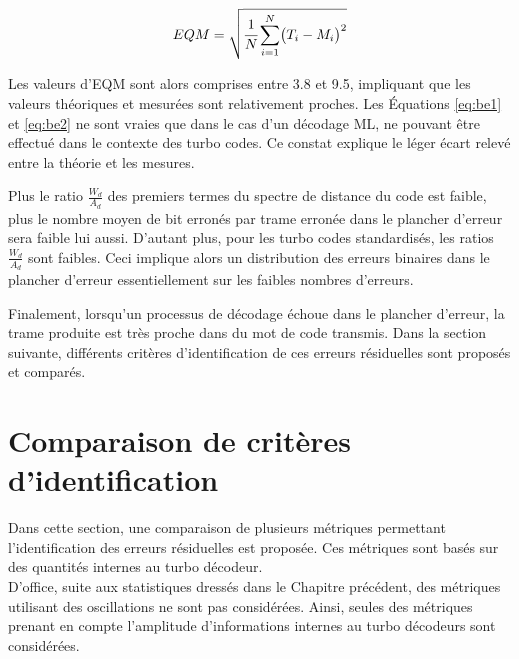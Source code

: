 \begin{equation}
	EQM = \sqrt{\cfrac{1}{N}\sum\limits_{i=1}^N\bigl(T_i-M_i\bigr)^2}
	\label{eq:eqm}
\end{equation}

Les valeurs d'EQM sont alors comprises entre 3.8 et 9.5, impliquant que les valeurs théoriques et mesurées sont 
relativement proches. Les Équations \ref{eq:be1} et \ref{eq:be2} ne sont vraies que dans le cas d'un décodage 
ML, ne pouvant être effectué dans le contexte des turbo codes. Ce constat explique le léger écart relevé entre la 
théorie et les mesures.

Plus le ratio $\frac{W_d}{A_d}$ des premiers termes du spectre de distance du code est faible, plus le nombre moyen de 
bit erronés par trame erronée dans le plancher d'erreur sera faible lui aussi. D'autant plus, pour les turbo codes 
standardisés, les ratios $\frac{W_d}{A_d}$ sont faibles. Ceci implique alors un distribution des erreurs binaires dans 
le plancher d'erreur essentiellement sur les faibles nombres d'erreurs.
\begin{table}[b]
\centering
\caption{Erreur quadratique moyenne entre théorie et simulations Monte-Carlo}
\label{tab:eqm}
\end{table}

Finalement, lorsqu'un processus de décodage échoue dans le plancher d'erreur, la trame produite est très proche dans du 
mot de code transmis. Dans la section suivante, différents critères d'identification de ces erreurs résiduelles sont 
proposés et comparés.
\newpage
\section{Comparaison de critères d'identification}
Dans cette section, une comparaison de plusieurs métriques permettant l'identification des erreurs résiduelles est 
proposée. Ces métriques sont basés sur des quantités internes au turbo décodeur.\\
D'office, suite aux statistiques dressés dans le Chapitre précédent, des métriques utilisant des oscillations ne sont 
pas considérées. Ainsi, seules des métriques prenant en compte l'amplitude d'informations internes au turbo décodeurs 
sont considérées.

